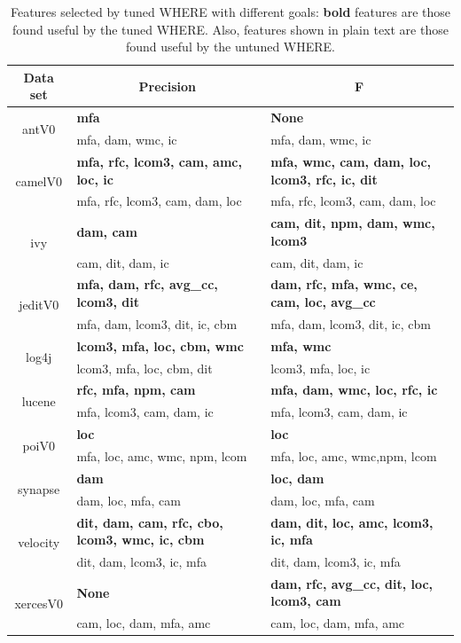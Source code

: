 \documentclass{sig-alternative}
\begin{document}
\begin{table}[!b]

\renewcommand{\baselinestretch}{0.8}
\scriptsize
\centering
  \begin{tabular}{c|p{1in}|p{1in}}
    \multicolumn{1}{c|}{ Data set}  &   \multicolumn{1}{c|}{Precision} & \multicolumn{1}{c}{F} \\ \hline 
 \multirow{2}{*}{antV0} & {\bf mfa} &  {\bf None} \\
         & mfa, dam, wmc, ic & mfa, dam, wmc, ic\\
  \hline
 \multirow{2}{*}{camelV0} & {\bf mfa, rfc, lcom3, cam, amc, loc, ic} &{\bf  mfa, wmc, cam, dam, loc, lcom3, rfc, ic, dit }\\
        & mfa, rfc, lcom3, cam, dam, loc & mfa, rfc, lcom3, cam, dam, loc\\
  \hline
 \multirow{2}{*}{ivy} & {\bf dam, cam} &{\bf  cam, dit, npm, dam, wmc, lcom3 }  \\
       & cam, dit, dam, ic & cam, dit, dam, ic \\
  \hline
 \multirow{2}{*}{jeditV0} &{\bf  mfa, dam, rfc, avg\_cc, lcom3, dit }&{\bf  dam, rfc, mfa, wmc, ce, cam, loc, avg\_cc}\\
         & mfa, dam, lcom3, dit, ic, cbm & mfa, dam, lcom3, dit, ic, cbm \\
  \hline
 \multirow{2}{*}{log4j} & {\bf lcom3, mfa, loc, cbm, wmc }&{\bf  mfa, wmc}\\
         & lcom3, mfa, loc, cbm, dit & lcom3, mfa, loc, ic \\
   \hline
  \multirow{2}{*}{lucene} & {\bf rfc, mfa, npm, cam} & {\bf mfa, dam, wmc, loc, rfc, ic}\\
         & mfa, lcom3, cam, dam, ic & mfa, lcom3, cam, dam, ic\\
   \hline
   \multirow{2}{*}{poiV0} & {\bf loc }& {\bf loc} \\
        & mfa, loc, amc, wmc, npm, lcom & mfa, loc, amc, wmc,npm, lcom\\
   \hline
   \multirow{2}{*}{synapse} &{\bf  dam} & {\bf loc, dam} \\
        & dam, loc, mfa, cam & dam, loc, mfa, cam\\
    \hline
   \multirow{2}{*}{velocity} & {\bf dit, dam, cam, rfc, cbo, lcom3, wmc, ic, cbm }& {\bf dam, dit, loc, amc, lcom3, ic, mfa }\\
        & dit, dam, lcom3, ic, mfa  & dit, dam, lcom3, ic, mfa\\
    \hline
   \multirow{2}{*}{xercesV0} &{\bf  None }&{\bf  dam, rfc, avg\_cc, dit, loc, lcom3, cam }\\
        & cam, loc, dam, mfa, amc &  cam, loc, dam, mfa, amc \\
    \hline
    
  \end{tabular}
  
    \caption{Features selected by tuned WHERE with different goals:
    {\bf bold} features are those found useful by the tuned WHERE.
    Also, features shown in plain text are those found useful by the untuned WHERE.
    }\label{tab:features}
\end{table}
\end{document}
